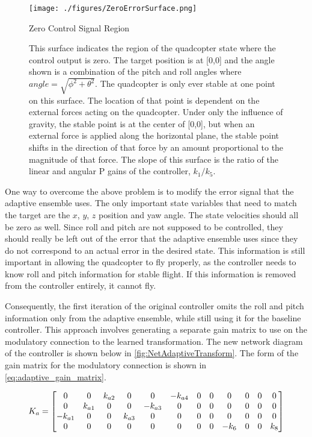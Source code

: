 \documentclass[letterpaper,12pt,titlepage,oneside,final]{book}
\begin{document}
\begin{figure}
\centering
\texttt{[image: ./figures/ZeroErrorSurface.png]} %
\caption{Zero Control Signal Region}
\label{fig:ZeroErrorSurface}
\captionsetup{singlelinecheck=off,font=footnotesize}
\caption*{
This surface indicates the region of the quadcopter state where the control output is zero.
The target position is at [0,0] and the angle shown is a combination of the pitch and roll angles where $angle = \sqrt{\phi^{2} + \theta^{2}}$.
The quadcopter is only ever stable at one point on this surface.
The location of that point is dependent on the external forces acting on the quadcopter.
Under only the influence of gravity, the stable point is at the center of [0,0], but when an external force is applied along the horizontal plane, the stable point shifts in the direction of that force by an amount proportional to the magnitude of that force.
The slope of this surface is the ratio of the linear and angular P gains of the controller, $k_{1}/k_{5}$.}
\end{figure}


One way to overcome the above problem is to modify the error signal that the adaptive ensemble uses. 
The only important state variables that need to match the target are the $x$, $y$, $z$ position and yaw angle. 
The state velocities should all be zero as well. 
Since roll and pitch are not supposed to be controlled, they should really be left out of the error that the adaptive ensemble uses since they do not correspond to an actual error in the desired state. 
This information is still important in allowing the quadcopter to fly properly, as the controller needs to know roll and pitch information for stable flight. If this information is removed from the controller entirely, it cannot fly.

Consequently, the first iteration of the original controller omits the roll and pitch information only from the adaptive ensemble, while still using it for the baseline controller. 
This approach involves generating a separate gain matrix to use on the modulatory connection to the learned transformation. 
The new network diagram of the controller is shown below in \autoref{fig:NetAdaptiveTransform}. 
The form of the gain matrix for the modulatory connection is shown in \eqref{eq:adaptive_gain_matrix}.

\begin{equation} \label{eq:adaptive_gain_matrix}
K_{a} =
\setcounter{MaxMatrixCols}{12}
\begin{bmatrix}
0 & 0 & k_{a2} & 0 & 0 & -k_{a4} & 0 & 0 & 0 & 0 & 0 & 0 \\
0 & k_{a1} & 0 & 0 & -k_{a3} & 0 & 0 & 0 & 0 & 0 & 0 & 0 \\
-k_{a1} & 0 & 0 & k_{a3} & 0 & 0 & 0 & 0 & 0 & 0 & 0 & 0 \\
0 & 0 & 0 & 0 & 0 & 0 & 0 & 0 & -k_{6} & 0 & 0 & k_{8}
\end{bmatrix}
\end{equation}
\end{document}
